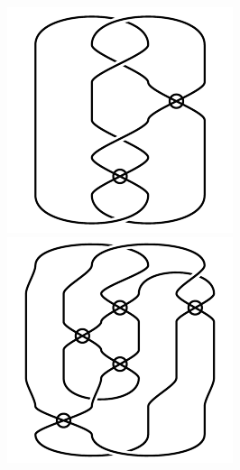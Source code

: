\begin{figure}[H]
\begin{minipage}[b]{.18\linewidth}
\end{minipage}
\begin{minipage}[b]{.18\linewidth}
\centering
\includegraphics[width=\linewidth]{../data/virtual_4_84.png}
\end{minipage}
\begin{minipage}[b]{.18\linewidth}
\centering
\includegraphics[width=\linewidth]{../data/virtual_4_85.png}

\end{minipage}
\end{figure}

